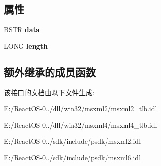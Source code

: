 \subsection*{属性}
\begin{DoxyCompactItemize}
\item 
\mbox{\label{interface_m_s_x_m_l2_1_1_i_x_m_l_d_o_m_character_data_a17b93eff864d832d9716abca90065118}} 
B\+S\+TR {\bfseries data}
\item 
\mbox{\label{interface_m_s_x_m_l2_1_1_i_x_m_l_d_o_m_character_data_a82f54a353113473652a9ec698e0bce56}} 
L\+O\+NG {\bfseries length}
\end{DoxyCompactItemize}
\subsection*{额外继承的成员函数}


该接口的文档由以下文件生成\+:\begin{DoxyCompactItemize}
\item 
E\+:/\+React\+O\+S-\/0../dll/win32/msxml2/msxml2\+\_\+tlb.\+idl\item 
E\+:/\+React\+O\+S-\/0../dll/win32/msxml4/msxml4\+\_\+tlb.\+idl\item 
E\+:/\+React\+O\+S-\/0../sdk/include/psdk/msxml2.\+idl\item 
E\+:/\+React\+O\+S-\/0../sdk/include/psdk/msxml6.\+idl\end{DoxyCompactItemize}
